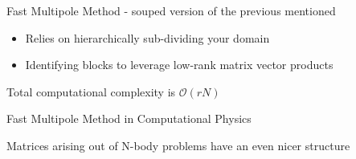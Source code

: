 \documentclass{article}
\newcommand{\cntr}[1]{\begin{center}#1\end{center}\vspace{1em}}
\begin{document}
	
	\newpage
	\cntr{Fast Multipole Method - souped version of the previous mentioned}
	
	\begin{itemize}
		\item Relies on hierarchically sub-dividing your domain
		\item Identifying blocks to leverage low-rank matrix vector products
	\end{itemize}

	\cntr{Total computational complexity is $\mathcal{O}(r N)$}
	
	\cntr{Fast Multipole Method in Computational Physics}
	
	\cntr{Matrices arising out of N-body problems have an even nicer structure}
\end{document}
